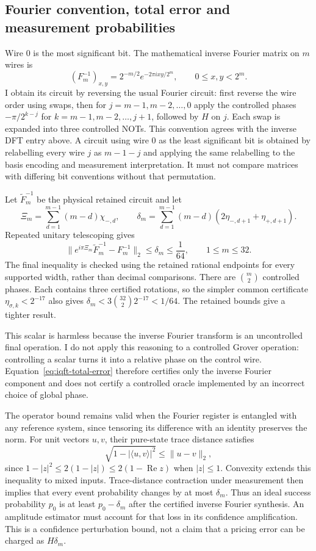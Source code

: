 \subsection{Fourier convention, total error and measurement probabilities}

Wire 0 is the most significant bit. The mathematical inverse Fourier matrix on $m$ wires is
\[
 (F_m^{-1})_{x,y}=2^{-m/2}e^{-2\pi ixy/2^m},
 \qquad0\leq x,y<2^m.
\]
I obtain its circuit by reversing the usual Fourier circuit: first reverse the wire order using swaps, then for $j=m-1,m-2,\ldots,0$ apply the controlled phases $-\pi/2^{k-j}$ for $k=m-1,m-2,\ldots,j+1$, followed by $H$ on $j$. Each swap is expanded into three controlled NOTs. This convention agrees with the inverse DFT entry above. A circuit using wire 0 as the least significant bit is obtained by relabelling every wire $j$ as $m-1-j$ and applying the same relabelling to the basis encoding and measurement interpretation. It must not compare matrices with differing bit conventions without that permutation.

Let $\widetilde F_m^{-1}$ be the physical retained circuit and let
\[
 \Xi_m=\sum_{d=1}^{m-1}(m-d)\chi_{-,d},\qquad
 \delta_m=\sum_{d=1}^{m-1}(m-d)
               (2\eta_{-,d+1}+\eta_{+,d+1}).
\]
Repeated unitary telescoping gives
\begin{equation}
 \|e^{i\pi\Xi_m}\widetilde F_m^{-1}-F_m^{-1}\|_2
  \leq\delta_m\leq\frac1{64},\qquad1\leq m\leq32.
 \label{eq:iqft-total-error}
\end{equation}
The final inequality is checked using the retained rational endpoints for every supported width, rather than decimal comparisons. There are $\binom m2$ controlled phases. Each contains three certified rotations, so the simpler common certificate $\eta_{\sigma,k}<2^{-17}$ also gives $\delta_m<3\binom{32}{2}2^{-17}<1/64$. The retained bounds give a tighter result.

This scalar is harmless because the inverse Fourier transform is an uncontrolled final operation. I do not apply this reasoning to a controlled Grover operation: controlling a scalar turns it into a relative phase on the control wire. Equation~\eqref{eq:iqft-total-error} therefore certifies only the inverse Fourier component and does not certify a controlled oracle implemented by an incorrect choice of global phase.

The operator bound remains valid when the Fourier register is entangled with any reference system, since tensoring its difference with an identity preserves the norm. For unit vectors $u,v$, their pure-state trace distance satisfies
\[
 \sqrt{1-|\langle u,v\rangle|^2}
 \leq\|u-v\|_2,
\]
since $1-|z|^2\leq2(1-|z|)\leq2(1-\operatorname{Re}z)$ when $|z|\leq1$. Convexity extends this inequality to mixed inputs. Trace-distance contraction under measurement then implies that every event probability changes by at most $\delta_m$. Thus an ideal success probability $p_0$ is at least $p_0-\delta_m$ after the certified inverse Fourier synthesis. An amplitude estimator must account for that loss in its confidence amplification. This is a confidence perturbation bound, not a claim that a pricing error can be charged as $H\delta_m$.


